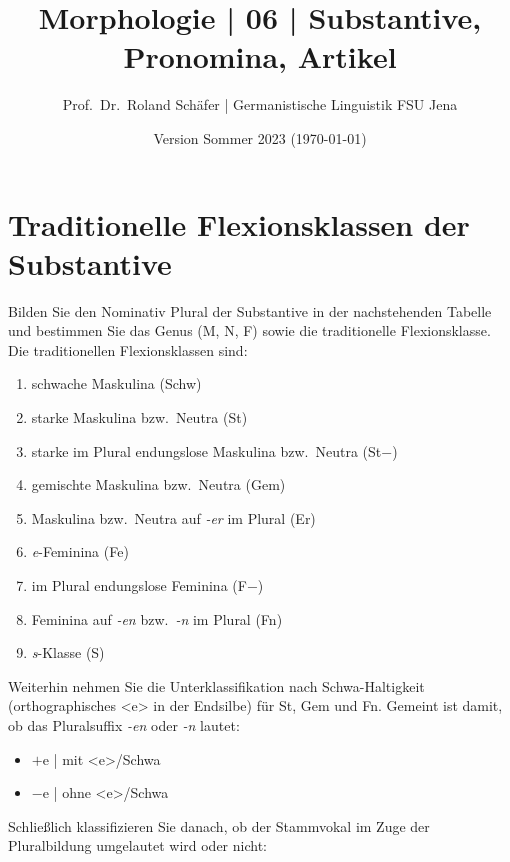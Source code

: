 \documentclass[12pt,a4paper,twoside]{article}
\author{Prof.\ Dr.\ Roland Schäfer | Germanistische Linguistik FSU Jena}
\title{Morphologie | 06 | Substantive, Pronomina, Artikel}
\date{Version Sommer 2023 (\today)}
\newcommand{\Lf}{
  \setlength{\itemsep}{1pt}
  \setlength{\parskip}{0pt}
  \setlength{\parsep}{0pt}
}
\begin{document}
\maketitle

\section{Traditionelle Flexionsklassen der Substantive}

Bilden Sie den Nominativ Plural der Substantive in der nachstehenden Tabelle und bestimmen Sie das Genus (M, N, F) sowie die traditionelle Flexionsklasse.
Die traditionellen Flexionsklassen sind:

\begin{enumerate}\Lf
  \item schwache Maskulina (Schw) %
  \item starke Maskulina bzw.\ Neutra (St) %
  \item starke im Plural endungslose Maskulina bzw.\ Neutra (St$-$) %
  \item gemischte Maskulina bzw.\ Neutra (Gem) %
  \item Maskulina bzw.\ Neutra auf \textit{-er} im Plural (Er)\footnotemark[1] %
  \item \textit{e}-Feminina (Fe)\footnotemark[1] %
  \item im Plural endungslose Feminina (F$-$)\footnotemark[1] %
  \item Feminina auf \textit{-en} bzw.\ \textit{-n} im Plural (Fn)\footnotemark[2] %
  \item \textit{s}-Klasse (S) %
\end{enumerate}


Weiterhin nehmen Sie die Unterklassifikation nach Schwa-Haltigkeit (orthographisches <e> in der Endsilbe) für St, Gem und Fn. Gemeint ist damit, ob das Pluralsuffix \textit{-en} oder \textit{-n} lautet:

\begin{itemize}\Lf
  \item $+$e | mit <e>\slash Schwa
  \item $-$e | ohne <e>\slash Schwa
\end{itemize}

Schließlich klassifizieren Sie danach, ob der Stammvokal im Zuge der Pluralbildung umgelautet wird oder nicht:
\end{document}
